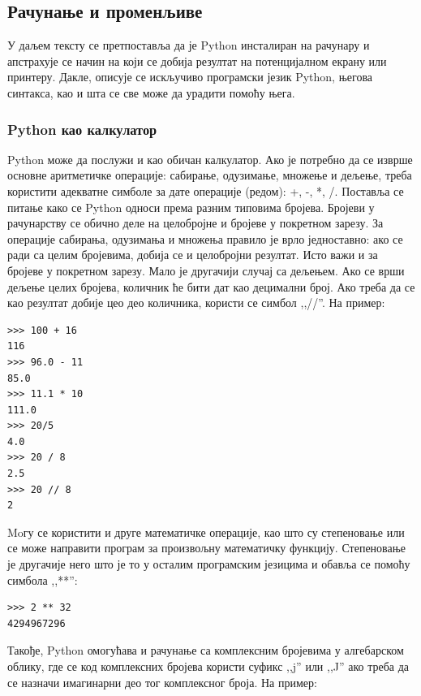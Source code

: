 \subsection{Рачунање и променљиве}

У даљем тексту се претпоставља да је Python инсталиран на рачунару и апстрахује се начин на који се добија резултат на потенцијалном екрану или принтеру. Дакле, описује се искључиво програмски језик Python, његова синтакса, као и шта се све може да урадити помоћу њега.

\subsubsection{Python као калкулатор}

Python може да послужи и као обичан калкулатор\cite{van2003introduction,lutz2009learning}. Ако је потребно да се изврше основне аритметичке операције: сабирање, одузимање, множење и дељење, треба користити адекватне симболе за дате операције (редом): +, -, *, /. Поставља се питање како се Python односи према разним типовима бројева. Бројеви у рачунарству се обично деле на целобројне и бројеве у покретном зарезу. За операције сабирања, одузимања и множења правило је врло једноставно: ако се ради са целим бројевима, добија се и целобројни резултат. Исто важи и за бројеве у покретном зарезу. Мало је другачији случај са дељењем. Ако се врши дељење целих бројева, количник ће бити дат као децимални број. Ако треба да се као резултат добије цео део количника, користи се симбол ,,//''. На пример:

\begin{lstlisting}[caption = Примери операција са бројевима, label = racun]
>>> 100 + 16
116
>>> 96.0 - 11
85.0
>>> 11.1 * 10
111.0
>>> 20/5
4.0
>>> 20 / 8
2.5
>>> 20 // 8
2
\end{lstlisting}

Moгу се користити и друге математичке операције, као што су степеновање или се може направити програм за произвољну математичку функцију. Степеновање је другачије него што је то у осталим програмским језицима и обавља се помоћу симбола ,,**'':

\begin{lstlisting}[caption = Степеновање, label = stepen]
>>> 2 ** 32
4294967296
\end{lstlisting}

Такође, Python омогућава и рачунање са комплексним бројевима у алгебарском облику, где се код комплексних бројева користи суфикс ,,j'' или ,,J'' ако треба да се назначи имагинарни део тог комплексног броја. На пример:

